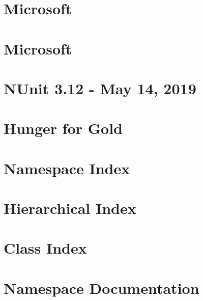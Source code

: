 \let\mypdfximage\pdfximage\def\pdfximage{\immediate\mypdfximage}\documentclass[twoside]{book}
\newcommand{\+}{\discretionary{\mbox{\scriptsize$\hookleftarrow$}}{}{}}
\begin{document}
\chapter{Microsoft}
\label{md_packages__microsoft_8_net_core_8_analyzers_82_89_83_documentation__microsoft_8_net_core_8_analyzers}

\chapter{Microsoft}
\label{md_packages__microsoft_8_net_framework_8_analyzers_82_89_83_documentation__microsoft_8_net_framework_8_analyzers}

\chapter{N\+Unit 3.12 -\/ May 14, 2019}
\label{md_packages__n_unit_83_812_80__c_h_a_n_g_e_s}

\chapter{Hunger for Gold}
\label{md__r_e_a_d_m_e}

\chapter{Namespace Index}

\chapter{Hierarchical Index}

\chapter{Class Index}

\chapter{Namespace Documentation}








\end{document}
